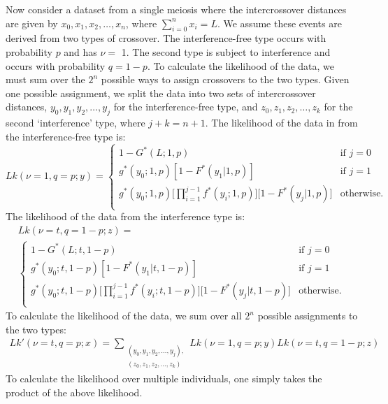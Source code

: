 Now consider a dataset from a single meiosis where the intercrossover distances are given by 
$x_0,x_1,x_2,\dots,x_n$, where $\sum_{i=0}^n x_i = L$. We assume these events are derived from 
two types of crossover. The interference-free type occurs with probability $p$ and has $\nu=$ 1.
The second type is subject to interference and occurs with probability $q = 1 - p$. 
To calculate the likelihood of the data, we must sum over the $2^n$ possible ways to assign 
crossovers to the two types. Given one possible assignment, we split the data into two sets of 
intercrossover distances, $y_0,y_1,y_2,\dots,y_j$ for the interference-free type, 
and $z_0,z_1,z_2,\dots,z_k$ for the second `interference' type, where $j + k = n + 1$.
The likelihood of the data in from the interference-free type is:  
\begin{equation}
    Lk(\nu = 1,q=p;y) =  
    \begin{cases}
        1 - G^*(L;1,p)
        & \text{if $j=0$} \\
        g^*(y_0;1,p) [ 1-F^*(y_1|1,p) ]
        & \text{if $j=1$} \\
        \displaystyle g^*(y_0;1,p) \Bigg[ \prod_{i=1}^{j-1} f^*(y_i;1,p) \Bigg] \Big[ 1-F^*(y_j|1,p) \Big]
        & \text{otherwise.} \\
    \end{cases}
\end{equation}
The likelihood of the data from the interference type is: 
\begin{multline}
    Lk(\nu = t,q=1-p;z) = \\
    \begin{cases}
        1 - G^*(L;t,1-p)
        & \text{if $j=0$} \\
        g^*(y_0;t,1-p) [ 1-F^*(y_1|t,1-p) ]
        & \text{if $j=1$} \\
        \displaystyle g^*(y_0;t,1-p) \Bigg[ \prod_{i=1}^{j-1} f^*(y_i;t,1-p) \Bigg] \Big[ 1-F^*(y_j|t,1-p) \Big]
        & \text{otherwise.} \\
    \end{cases}
\end{multline}
To calculate the likelihood of the data, we sum over all $2^n$ possible assignments to the two types:  
\begin{multline}
    Lk'(\nu=t,q=p;x) =
    \sum_{\substack{ (y_0,y_1,y_2,\dots,y_j),\\
                     (z_0,z_1,z_2,\dots,z_k) 
             }} Lk(\nu=1,q=p;y) Lk(\nu=t,q=1-p;z)
\end{multline}
To calculate the likelihood over multiple individuals, one simply takes the product of the above likelihood.  


